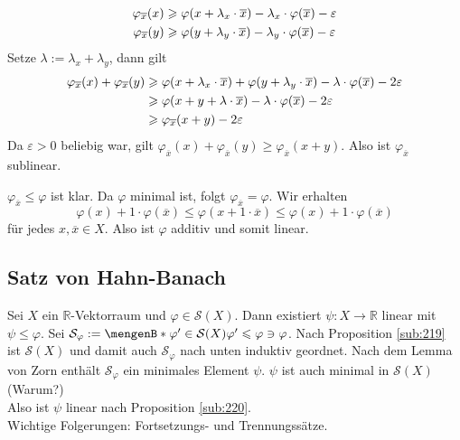 \begin{description}
\begin{enumerate}[(i)]
		\begin{align*}
			\varphi_{\overline{x}}(x) &\ge \varphi \enbrace*{x + \lambda_x \cdot \overline{x}} - \lambda_x \cdot \varphi(\overline{x}) - \varepsilon \\
			\varphi_{\overline{x}}(y) &\ge \varphi \enbrace*{y + \lambda_y \cdot \overline{x}} - \lambda_y \cdot \varphi(\overline{x}) - \varepsilon 
		\end{align*}
		Setze $\lambda  := \lambda_x + \lambda_y$, dann gilt
		\begin{align*}
			\varphi_{\overline{x}}(x) + \varphi_{\overline{x}}(y) &\ge \varphi \enbrace*{ x+ \lambda_x \cdot \overline{x}} + 
			\varphi \enbrace*{y+ \lambda_y \cdot \overline{x} } - \lambda  \cdot \varphi(\overline{x}) - 2 \varepsilon \\
			&\ge  \varphi \enbrace*{x +y + \lambda \cdot \overline{x}} - \lambda  \cdot \varphi(\overline{x}) - 2 \varepsilon \\
			&\ge \varphi_{\overline{x}} (x+y) - 2 \varepsilon
		\end{align*}
		Da $\varepsilon>0$ beliebig war, gilt $\varphi_{\overline{x}}(x) + \varphi_{\overline{x}}(y) \ge \varphi_{\overline{x}}(x+y)$. Also ist $\varphi_{\overline{x}}$
		sublinear.
	\end{enumerate}
	$\varphi_{\overline{x}} \le \varphi$ ist klar. Da $\varphi$ minimal ist, folgt $\varphi_{\overline{x}} = \varphi$. Wir erhalten 
	\[
		\varphi(x) + 1 \cdot \varphi(\overline{x}) \le \varphi(x+ 1 \cdot \overline{x}) \le \varphi(x) + 1 \cdot \varphi(\overline{x})
	\]
	für jedes $x, \overline{x}\in X$. Also ist $\varphi$ additiv und somit linear. \bewende
\end{description}

\subsection{Satz von Hahn-Banach} %
\label{sub:221}
Sei $X$ ein $\mathds{R}$-Vektorraum und $\varphi \in \mathcal{S}(X)$.
Dann existiert $\psi : X \to \mathds{R}$ linear mit $\psi \le \varphi$.
Sei $\mathcal{S}_\varphi : =\set[\varphi' \in \mathcal{S}(X)]{\varphi' \le \varphi} \ni \varphi$. Nach Proposition \ref{sub:219} ist $\mathcal{S}(X)$ und damit auch 
$\mathcal{S}_\varphi$ nach unten induktiv geordnet. Nach dem Lemma von Zorn enthält $\mathcal{S}_\varphi$ ein minimales Element $\psi$. $\psi$ ist auch minimal in 
$\mathcal{S}(X)$ \hfill (Warum?)\\
Also ist $\psi$ linear nach Proposition \ref{sub:220}. \bewende \medskip \\
Wichtige Folgerungen: Fortsetzungs- und Trennungssätze.

